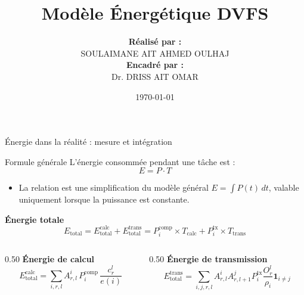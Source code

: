 \documentclass[10pt,aspectratio=169]{beamer}
\title{Modèle Énergétique DVFS}
\author{
\begin{tabular}{c}
\textbf{Réalisé par :} \\ 
SOULAIMANE AIT AHMED OULHAJ \\[0.5cm]
\textbf{Encadré par :} \\ 
Dr. DRISS AIT OMAR
\end{tabular}
}
\date{\today}
\begin{document}
\begin{frame}
\titlepage
\end{frame}

\begin{frame}{Énergie dans la réalité : mesure et intégration}
\begin{block}{Formule générale}
    L'énergie consommée pendant une tâche est :
    \begin{equation*}
        E = P \cdot T
    \end{equation*}
    \begin{itemize}
        \item La relation est une simplification du modèle général 
        \textbf{$E = \int P(t)\,dt$}, valable uniquement lorsque la puissance est constante.
    \end{itemize}
\end{block}

\centering
      \large\textbf{Énergie totale}
      \[
      E_{\text{total}} = E^{\text{calc}}_{\text{total}} + E^{\text{trans}}_{\text{total}} = P_i^{\text{comp}} \times T_{\text{calc}} + P_i^{\text{tx}} \times T_{\text{trans}} 
      \]

\begin{columns}[T]
    \begin{column}{0.50\textwidth}
        \centering
        \textbf{Énergie de calcul}
        \[
        E^{\text{calc}}_{\text{total}} = \sum_{i,r,l} A^i_{r,l} \, P_i^{\text{comp}} \, \frac{c^l_r}{e(i)}
        \]
    \end{column}
    
    \begin{column}{0.50\textwidth}
        \centering
        \textbf{Énergie de transmission}
        \[
        E^{\text{trans}}_{\text{total}} = \sum_{i,j,r,l} A^i_{r,l} A^j_{r,l+1} P_i^{\text{tx}} \frac{O^l_r}{\rho_i} \mathbf{1}_{i\neq j}
        \]
    \end{column}
\end{columns}

\end{frame}
\end{document}
